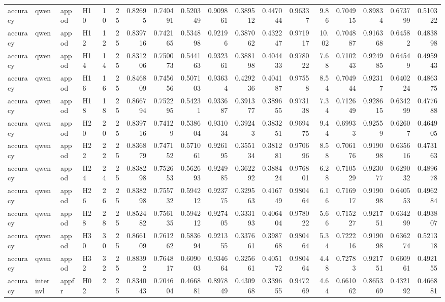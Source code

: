 \begin{longtable}{llllrrrrrrrrrrrrrr}
accuracy & qwen & appod & H10 & 10 & 25 & 0.82695 & 0.740491 & 0.520349 & 0.909861 & 0.389512 & 0.447044 & 0.96337 & 9.86 & 0.704915 & 0.89834 & 0.673799 & 0.510322 \\
accuracy & qwen & appod & H12 & 12 & 25 & 0.839716 & 0.742165 & 0.534898 & 0.92196 & 0.387062 & 0.432247 & 0.971917 & 10.02 & 0.704887 & 0.916368 & 0.64582 & 0.483898 \\
accuracy & qwen & appod & H14 & 14 & 25 & 0.831206 & 0.750073 & 0.544163 & 0.932361 & 0.388198 & 0.404433 & 0.978022 & 7.68 & 0.710243 & 0.924985 & 0.64549 & 0.495943 \\
accuracy & qwen & appod & H16 & 16 & 25 & 0.846809 & 0.745656 & 0.507103 & 0.93634 & 0.429236 & 0.404187 & 0.97558 & 8.54 & 0.704944 & 0.92317 & 0.640224 & 0.486375 \\
accuracy & qwen & appod & H18 & 18 & 25 & 0.866794 & 0.752295 & 0.54231 & 0.933687 & 0.391377 & 0.389655 & 0.973138 & 7.34 & 0.712649 & 0.928615 & 0.634299 & 0.477688 \\
accuracy & qwen & appod & H20 & 20 & 25 & 0.839716 & 0.74129 & 0.538604 & 0.931034 & 0.39243 & 0.383251 & 0.969475 & 9.44 & 0.69933 & 0.92559 & 0.62607 & 0.464905 \\
accuracy & qwen & appod & H22 & 22 & 25 & 0.836879 & 0.747152 & 0.571061 & 0.926195 & 0.355134 & 0.381281 & 0.970696 & 8.58 & 0.706176 & 0.919098 & 0.635616 & 0.473163 \\
accuracy & qwen & appod & H24 & 24 & 25 & 0.838298 & 0.752653 & 0.562693 & 0.924985 & 0.362292 & 0.388424 & 0.976801 & 6.28 & 0.710529 & 0.923077 & 0.629032 & 0.489678 \\
accuracy & qwen & appod & H26 & 26 & 25 & 0.838298 & 0.755732 & 0.594212 & 0.923775 & 0.329563 & 0.416749 & 0.980464 & 6.16 & 0.716917 & 0.919098 & 0.640553 & 0.496284 \\
accuracy & qwen & appod & H28 & 28 & 25 & 0.852482 & 0.756135 & 0.594212 & 0.927405 & 0.333193 & 0.406404 & 0.978022 & 5.66 & 0.715227 & 0.921751 & 0.634299 & 0.493807 \\
accuracy & qwen & appod & H30 & 30 & 25 & 0.866109 & 0.761262 & 0.583694 & 0.921355 & 0.337661 & 0.398768 & 0.980464 & 5.34 & 0.722216 & 0.919098 & 0.636274 & 0.521318 \\
accuracy & qwen & appod & H32 & 32 & 25 & 0.88392 & 0.764817 & 0.609003 & 0.934664 & 0.325661 & 0.405172 & 0.980464 & 4.48 & 0.72783 & 0.921751 & 0.660961 & 0.492155 \\
accuracy & internvl & appfr & H02 & 2 & 25 & 0.834043 & 0.704604 & 0.466881 & 0.897849 & 0.430968 & 0.339655 & 0.947269 & 4.64 & 0.661062 & 0.865369 & 0.432192 & 0.466881 \\

\end{longtable}
